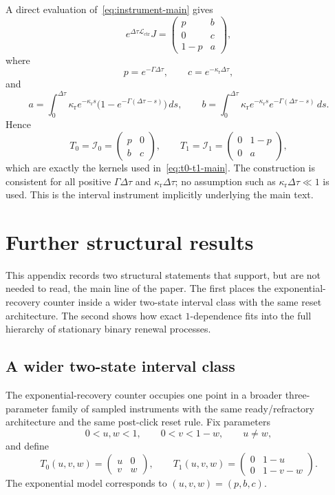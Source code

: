 A direct evaluation of~\eqref{eq:instrument-main} gives
\[
e^{\Delta\tau\mathcal L_{\mathrm{ctr}}}J=
\begin{pmatrix}
p & b\\
0 & c\\
1-p & a
\end{pmatrix},
\]
where
\[
p=e^{-\Gamma\Delta\tau},
\qquad
c=e^{-\kappa_{\mathrm r}\Delta\tau},
\]
and
\[
a=\int_0^{\Delta\tau}\kappa_{\mathrm r}e^{-\kappa_{\mathrm r}s}\bigl(1-e^{-\Gamma(\Delta\tau-s)}\bigr)\,ds,
\qquad
b=\int_0^{\Delta\tau}\kappa_{\mathrm r}e^{-\kappa_{\mathrm r}s}e^{-\Gamma(\Delta\tau-s)}\,ds.
\]
Hence
\[
T_0=\mathcal I_0=
\begin{pmatrix}
p & 0\\
b & c
\end{pmatrix},
\qquad
T_1=\mathcal I_1=
\begin{pmatrix}
0 & 1-p\\
0 & a
\end{pmatrix},
\]
which are exactly the kernels used in~\eqref{eq:t0-t1-main}. The construction is consistent for all positive $\Gamma\Delta\tau$ and $\kappa_{\mathrm r}\Delta\tau$; no assumption such as $\kappa_{\mathrm r}\Delta\tau\ll1$ is used. This is the interval instrument implicitly underlying the main text.

\section{Further structural results}\label{app:structural-results}

This appendix records two structural statements that support, but are not needed to read, the main line of the paper. The first places the exponential-recovery counter inside a wider two-state interval class with the same reset architecture. The second shows how exact $1$-dependence fits into the full hierarchy of stationary binary renewal processes.

\subsection{A wider two-state interval class}

The exponential-recovery counter occupies one point in a broader three-parameter family of sampled instruments with the same ready/refractory architecture and the same post-click reset rule. Fix parameters
\[
0<u,w<1,\qquad 0<v<1-w,\qquad u\neq w,
\]
and define
\begin{equation}\label{eq:general-kernels-main}
T_0(u,v,w)=
\begin{pmatrix}
u & 0\\
v & w
\end{pmatrix},
\qquad
T_1(u,v,w)=
\begin{pmatrix}
0 & 1-u\\
0 & 1-v-w
\end{pmatrix}.
\end{equation}
The exponential model corresponds to $(u,v,w)=(p,b,c)$.

